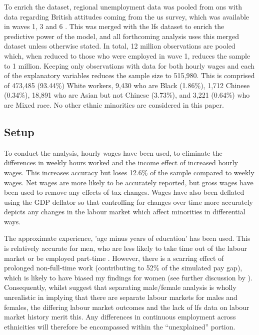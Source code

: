 \documentclass[class=article, crop=false]{standalone}
\begin{document}
To enrich the dataset, regional unemployment data was pooled from \acrlong{ons} \citep{ONSf} with data regarding British attitudes coming from the \acrfull{us} survey, which was available in waves 1, 3 and 6 \citep{US}. This was merged with the \acrshort{lfs} dataset to enrich the predictive power of the model, and all forthcoming analysis uses this merged dataset unless otherwise stated. In total, 12 million observations are pooled which, when reduced to those who were employed in wave 1, reduces the sample to 1 million. Keeping only observations with data for both hourly wages and each of the explanatory variables reduces the sample size to 515,980. This is comprised of 473,485 (93.44\%) White workers, 9,430 who are Black (1.86\%), 1,712 Chinese (0.34\%), 18,891 who are  Asian but not Chinese (3.73\%), and 3,221 (0.64\%) who are Mixed race. No other ethnic minorities are considered in this paper.

\subsection{Setup}
\label{sec:Setup}
To conduct the analysis, hourly wages have been used, to eliminate the differences in weekly hours worked and the income effect of increased hourly wages. This increases accuracy but loses 12.6\% of the sample compared to weekly wages. Net wages are more likely to be accurately reported, but gross wages have been used to remove any effects of tax changes. Wages have also been deflated using the GDP deflator \citep{ONSh} so that controlling for changes over time more accurately depicts any changes in the labour market which affect minorities in differential ways. 

The approximate experience, 'age minus years of education' has been used. This is relatively accurate for men, who are less likely to take time out of the labour market or be employed part-time \citep{Olsen}. However, there is a scarring effect of prolonged non-full-time work (contributing to 52\% of the simulated pay gap), which is likely to have biased my findings for women (see further discussion by \citet{Walby}). Consequently, whilst \citeauthor{Olsen} suggest that separating male/female analysis is wholly unrealistic in implying that there are separate labour markets for males and females, the differing labour market outcomes \citep{GOVa} and the lack of \acrshort{lfs} data on labour market history merit this. Any differences in continuous employment across ethnicities will therefore be encompassed within the \enquote{unexplained} portion.
\end{document}
